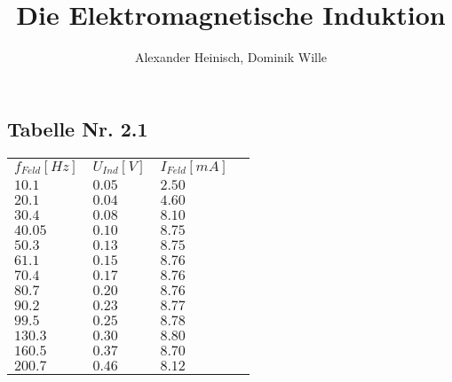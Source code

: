 \documentclass{article}
\title{Die Elektromagnetische Induktion}
\author{Alexander Heinisch, Dominik Wille}
\begin{document}
\subsection*{Tabelle Nr. 2.1}
\begin{tabular}{l l l l}
\(f_{Feld}[Hz]\) & \(U_{Ind}[V]\) & \(I_{Feld}[mA]\) \\
\(10.1\) & \(0.05\) & \(2.50\) \\
\(20.1\) & \(0.04\) & \(4.60\) \\
\(30.4\) & \(0.08\) & \(8.10\) \\
\(40.05\) & \(0.10\) & \(8.75\) \\
\(50.3\) & \(0.13\) & \(8.75\) \\
\(61.1\) & \(0.15\) & \(8.76\) \\
\(70.4\) & \(0.17\) & \(8.76\) \\
\(80.7\) & \(0.20\) & \(8.76\) \\
\(90.2\) & \(0.23\) & \(8.77\) \\
\(99.5\) & \(0.25\) & \(8.78\) \\
\(130.3\) & \(0.30\) & \(8.80\) \\
\(160.5\) & \(0.37\) & \(8.70\) \\
\(200.7\) & \(0.46\) & \(8.12\) \\
\end{tabular}
\end{document}
